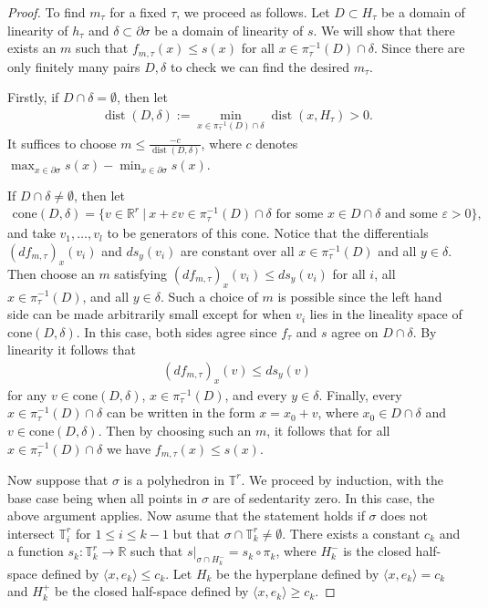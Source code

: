 \documentclass[11pt]{article}
\numberwithin{equation}{numsection}
\newcommand{\R}{{\mathbb R}}
\newcommand{\TT}{{\mathbb T}}
\newcommand{\diff}{d}
\DeclareMathOperator{\dist}{dist}
\begin{document}
\begin{proof}
To find {$m_\tau$} for a fixed $\tau$, 
we proceed as follows.
Let $D \subset H_\tau$ be a domain of linearity
of $h_\tau$ and $\delta \subset \partial \sigma$
be a domain of linearity of $s$. 
We will show that there exists an $m$ such that $f_{m,\tau}(x) \leq s(x)$
for all $x \in \pi_\tau^{-1}(D) \cap \delta$. 
Since there are only finitely  many pairs $D,\delta$ to check we can find the desired $m_\tau$. 

Firstly, if $D \cap \delta = \emptyset$,
then let 
\begin{align*}
\dist(D, \delta) := \min_{x \in \pi_\tau^{-1}(D) \cap \delta} \dist(x, H_\tau) > 0.
\end{align*} 
It suffices to choose $m \leq \frac{-c}{\dist(D,\delta)}$, where $c$ denotes 
$\max_{x\in \partial \sigma} s(x) - \min_{x\in \partial \sigma} s(x)$. 


If $D \cap \delta \neq \emptyset$, then let 
\begin{align*}
\text{cone}(D,\delta) = \{ v \in \R^r \ | \ x + \varepsilon v \in \pi^{-1}_{\tau}(D) \cap \delta \text{ for some }  x \in D \cap \delta \text{ and some } \varepsilon >0\}, 
\end{align*}
 and take $v_1, \dots, v_l$ to be generators of this cone. 
Notice that the differentials 
$(\diff f_{m,\tau})_x (v_i)$ and $\diff s_y(v_i)$ are constant over all $x \in \pi^{-1}_{\tau}(D) $ and all  $y \in \delta$. 
Then choose an $m$ satisfying 
$(\diff f_{m,\tau})_x (v_i) \leq \diff s_y(v_i)$
for all $i$, all $x \in \pi^{-1}_{\tau}(D) $, and all $y \in \delta$. 
Such a choice of $m$ is  possible since the left hand side can be made arbitrarily small except 
for when $v_i$ lies in the lineality space of $\text{cone}(D,\delta)$.
In this case, both sides
agree since $f_\tau$ and $s$ agree on $D \cap \delta$.
By linearity it follows that 
\begin{align*}
(\diff f_{m,\tau})_x (v) \leq \diff s_y(v)
\end{align*}
for any $v \in \text{cone}(D,\delta)$, $x \in \pi^{-1}_{\tau}(D)$, and every $y \in \delta$. Finally, every 
$x \in \pi_\tau^{-1}(D) \cap \delta$ can be written in the form 
$x = x_0 + v$, where $x_0 \in D \cap \delta$ and $v \in \text{cone}(D,\delta)$. 
Then by choosing such an $m$, it  follows that for all $x \in \pi^{-1}_ \tau (D) \cap \delta $ we have $f_{m, \tau}(x) \leq s(x)$. 



Now suppose that $\sigma$ is a polyhedron in $\TT^r$. 
We proceed by induction, with the base case being when all points in $\sigma$ are of sedentarity zero. 
In this case, the above argument applies. 
Now asume that the statement holds if  $\sigma$ does not intersect $\TT^r_i$ for $1 \leq i \leq   k-1$ but that $\sigma \cap \TT^r_k \neq \emptyset$. 
There  exists a  constant $c_k$ and a function $s_k \colon \TT^r_k \to \R$ such that $s|_{\sigma \cap H_k^- } = s_k \circ \pi_k$, where $H_k^-$ is the closed half-space defined by $\langle x, e_k \rangle \leq  c_k$. Let  $H_k$  be the hyperplane defined by $\langle x, e_k \rangle =  c_k$ and $H_k^+$ be the  closed half-space defined by $\langle x, e_k \rangle \geq  c_k$. 



\end{proof}
\end{document}
